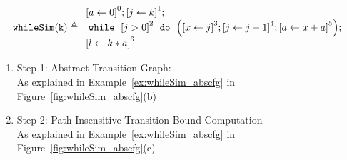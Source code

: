 \begin{example}
  \label{ex:whileSigle}
  $$
  \kw{whileSim(k)} \triangleq
    \begin{array}{l}
        \clabel{ \assign{a}{0}}^{0} ;   
              \clabel{\assign{j}{k} }^{1} ;\\
              \ewhile ~ \clabel{j > 0}^{2} ~ \edo ~ 
              \Big(
               \clabel{\assign{x}{j} }^{3}  ;
               \clabel{\assign{j}{j-1}}^{4} ;
              \clabel{\assign{a}{x + a}}^{5}  \Big);\\
              \clabel{\assign{l}{k * a} }^{6}
          \end{array}
  $$
\end{example}
  \begin{enumerate}
    \item Step 1: Abstract Transition Graph:
    \\
    As explained in Example~\ref{ex:whileSim_abscfg} in Figure~\ref{fig:whileSim_abscfg}(b)
  
  \item Step 2: Path Insensitive Transition Bound Computation
  \\
  As explained in Example~\ref{ex:whileSim_abscfg} in Figure~\ref{fig:whileSim_abscfg}(c)


\end{enumerate}
